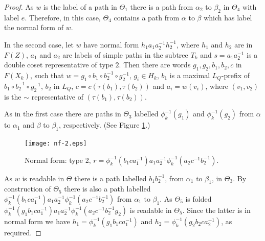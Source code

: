 \documentclass[a4paper,12pt]{article}
\renewcommand{\a}{\alpha }
\renewcommand{\b}{\beta }
\newcommand{\T}{\Theta }
\renewcommand{\t}{\tau }
\numberwithin{equation}{section}
\numberwithin{figure}{section}
\begin{document}
\begin{proof}
As $w$ is the label of a path in $\T_1$ there is a path from $\a_2$ to
$\b_2$ in $\T_4$ with label $e$. Therefore, in this case, $\T_4$ contains
a path from $\a$ to $\b$ which has label the normal form of $w$.

In the second case,
let $w$ have normal form $h_1 a_1 a_2^{-1} h_2^{-1} $, where
$h_1$ and $h_2$ are in $F(Z)$,  $a_1$ and $a_2$ are labels
of simple paths in the subtree $T_k$ and $s=a_1a_2^{-1}$ is a double coset
representative of type $2$. Then there are words
$g_1, g_2, b_1, b_2, c$  in $F(X_k)$,  such that
$w=g_1\circ b_1 \circ b_2^{-1}\circ g_2^{-1}$,
$g_i\in H_k$, $b_1$ is a maximal $L_Q$-prefix of 
$b_1 \circ b_2^{-1}\circ g_2^{-1}$, $b_2$ in 
$L_Q$, $c=c(\t(b_1),\t(b_2))$ and $a_i=w(v_i)$, where 
$(v_1,v_2)$ is the $\sim$ representative of $(\t(b_1),\t(b_2))$. 



As in the first case there are paths in $\T_3$ labelled 
$\phi_k^{-1}(g_1)$ and 
$\phi_k^{-1}(g_2)$ from $\a$ to $\a_1$ and $\b$ to $\b_1$, respectively.
(See Figure \ref{fig:nf-2}.)
\begin{figure}
\begin{center}
\psfrag{a}{$\a$}
\psfrag{b}{$\b$}
\psfrag{a1}{$\a_1$}
\psfrag{a2}{$\a_2$}
\psfrag{b1}{$\b_1$}
\psfrag{b2}{$\b_2$}
\psfrag{Th5}{$\T_5$}
\texttt{[image: nf-2.eps]}
\end{center}
\caption{Normal form: type 2, $r=\phi_k^{-1}(b_1ca_1^{-1})a_1a_2^{-1}\phi_k^{-1}(a_2c^{-1}b_2^{-1})$.}
\label{fig:nf-2}
\end{figure}
As $w$ is readable in $\T$ there is a path labelled $b_1b_2^{-1}$, from
$\a_1$ to $\b_1$, in $\T_3$. 
By construction of $\T_5$ there is also a path labelled 
$\phi_k^{-1}(b_1ca_1^{-1})a_1a_2^{-1}\phi_k^{-1}(a_2c^{-1}b_2^{-1})$
from $\a_1$ to $\b_1$. As $\T_5$ is folded 
$
\phi_k^{-1}(g_1 b_1ca_1^{-1})a_1a_2^{-1}\phi_k^{-1}(a_2c^{-1}b_2^{-1}g_2)$
 is readable in
$\T_5$. Since the latter is in normal form we have 
$h_1 = \phi_k^{-1}(g_1 b_1ca_1^{-1})$ and 
$h_2= \phi_k^{-1}(g_2 b_2ca_2^{-1})$, as required.  
\end{proof}
\end{document}
